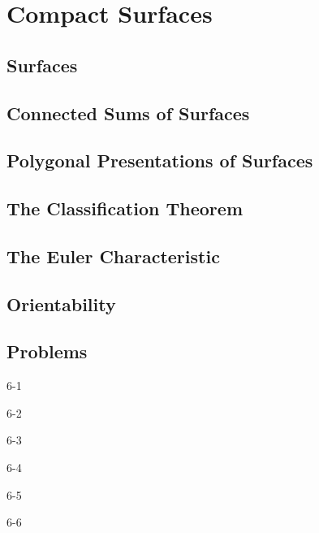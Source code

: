 \chapter{Compact Surfaces}

\section{Surfaces}

\section{Connected Sums of Surfaces}

\section{Polygonal Presentations of Surfaces}

\section{The Classification Theorem}

\section{The Euler Characteristic}

\section{Orientability}

\section*{Problems}

\begin{problem}{6-1}\label{problem:6-1}
\end{problem}

\begin{problem}{6-2}\label{problem:6-2}
\end{problem}

\begin{problem}{6-3}\label{problem:6-3}
\end{problem}

\begin{problem}{6-4}\label{problem:6-4}
\end{problem}

\begin{problem}{6-5}\label{problem:6-5}
\end{problem}

\begin{problem}{6-6}\label{problem:6-6}
\end{problem}
